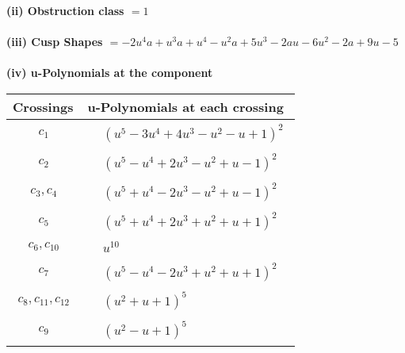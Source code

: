 \documentclass[1p]{elsarticle_modified}
\theoremstyle{definition}
\begin{document}
\flushleft \textbf{(ii) Obstruction class $= 1$}\\~\\
\flushleft \textbf{(iii) Cusp Shapes $= -2 u^4 a+u^3 a+u^4- u^2 a+5 u^3-2 a u-6 u^2-2 a+9 u-5$}\\~\\
\newpage\renewcommand{\arraystretch}{1}
\flushleft \textbf{(iv) u-Polynomials at the component}\newline \\
\begin{tabular}{m{50pt}|m{274pt}}
Crossings & \hspace{64pt}u-Polynomials at each crossing \\
\hline $$\begin{aligned}c_{1}\end{aligned}$$&$\begin{aligned}
&(u^5-3 u^4+4 u^3- u^2- u+1)^2
\end{aligned}$\\
\hline $$\begin{aligned}c_{2}\end{aligned}$$&$\begin{aligned}
&(u^5- u^4+2 u^3- u^2+u-1)^2
\end{aligned}$\\
\hline $$\begin{aligned}c_{3},c_{4}\end{aligned}$$&$\begin{aligned}
&(u^5+u^4-2 u^3- u^2+u-1)^2
\end{aligned}$\\
\hline $$\begin{aligned}c_{5}\end{aligned}$$&$\begin{aligned}
&(u^5+u^4+2 u^3+u^2+u+1)^2
\end{aligned}$\\
\hline $$\begin{aligned}c_{6},c_{10}\end{aligned}$$&$\begin{aligned}
&u^{10}
\end{aligned}$\\
\hline $$\begin{aligned}c_{7}\end{aligned}$$&$\begin{aligned}
&(u^5- u^4-2 u^3+u^2+u+1)^2
\end{aligned}$\\
\hline $$\begin{aligned}c_{8},c_{11},c_{12}\end{aligned}$$&$\begin{aligned}
&(u^2+u+1)^5
\end{aligned}$\\
\hline $$\begin{aligned}c_{9}\end{aligned}$$&$\begin{aligned}
&(u^2- u+1)^5
\end{aligned}$\\
\hline
\end{tabular}\\~\\
\end{document}
